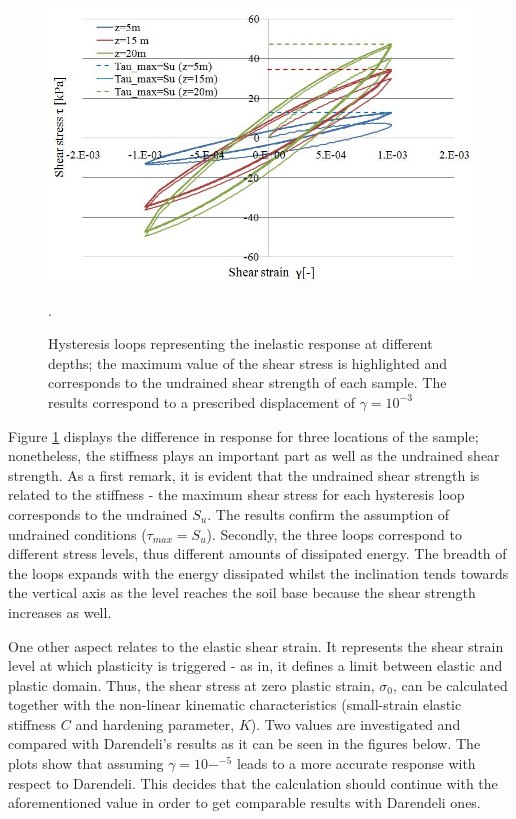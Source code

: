 \documentclass[11pt,a4paper]{report}
\begin{document}
\begin{figure}[h!]
	\centering
	\includegraphics[width=0.8\linewidth]{"oneElem1"}
	\caption{Hysteresis loops representing the inelastic response at different depths; the maximum value of the shear stress is highlighted and corresponds to the undrained shear strength of each sample. The results correspond to a prescribed displacement of $\gamma=10^{-3}$}
	\label{loops2}.
\end{figure}

Figure \ref{loops2} displays the difference in response for three locations of the sample; nonetheless, the stiffness plays an important part as well as the undrained shear strength. As a first remark, it is evident that the undrained shear strength is related to the stiffness - the maximum shear stress for each hysteresis loop corresponds to the undrained $S_u$. The results confirm the assumption of undrained conditions ($\tau_{max}=S_u$). Secondly, the three loops correspond to different stress levels, thus different amounts of dissipated energy. The breadth of the loops expands with the energy dissipated whilst the inclination tends towards the vertical axis as the level reaches the soil base because the shear strength increases as well. 

One other aspect relates to the elastic shear strain. It represents the shear strain level at which plasticity is triggered - as in, it defines a limit between elastic and plastic domain. Thus, the shear stress at zero plastic strain, $\sigma_0$, can be calculated together with the non-linear kinematic characteristics (small-strain elastic stiffness $C$ and hardening parameter, $K$). Two values are investigated and compared with Darendeli's results as it can be seen in the figures below. The plots show that assuming $\gamma=10-^{-5}$ leads to a more accurate response with respect to Darendeli. This decides that the calculation should continue with the aforementioned value in order to get comparable results with Darendeli ones.
\end{document}
